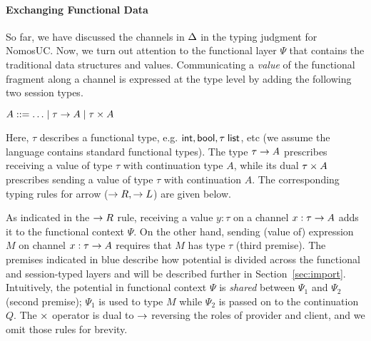 \paragraph*{\textbf{Exchanging Functional Data}}
So far, we have discussed the channels in $\Delta$ in the typing judgment for NomosUC.
Now, we turn out attention to the functional layer $\Psi$ that contains the
traditional data structures and values.
Communicating a \emph{value} of the functional fragment along a channel
is expressed at the type level by adding the following two session types.
\begin{center}
\begin{minipage}{0cm}
\begin{tabbing}
$A ::= \ldots \mid \tau \rightarrow A \mid \tau \times A$
\end{tabbing}
\end{minipage}
\end{center}
Here, $\tau$ describes a functional type, e.g. $\mathsf{int}, \mathsf{bool}, \tau \; \mathsf{list}$, etc
(we assume the language contains standard functional types).
The type $\tau \rightarrow A$ prescribes receiving a value of type $\tau$
with continuation type $A$, while its dual $\tau \times A$ prescribes
sending a value of type $\tau$ with continuation $A$. The corresponding
typing rules for arrow ($\rightarrow R, \rightarrow L$) are given below.
As indicated in the $\rightarrow R$ rule, receiving a value $y : \tau$ on a channel
$x : \tau \rightarrow A$ adds it to the functional context $\Psi$. On the
other hand, sending (value of) expression $M$ on channel $x : \tau \rightarrow A$
requires that $M$ has type $\tau$ (third premise).
The premises indicated in blue describe how potential is divided across
the functional and session-typed layers and will be described further in Section~\ref{sec:import}.
Intuitively, the potential in functional context $\Psi$ is \emph{shared}
between $\Psi_1$ and $\Psi_2$ (second premise); $\Psi_1$ is used to type
$M$ while $\Psi_2$ is passed on to the continuation $Q$.
The $\times$ operator is dual to $\rightarrow$ reversing the roles of provider and client,
and we omit those rules for brevity.



